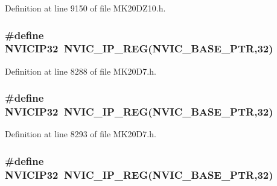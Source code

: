 Definition at line 9150 of file M\+K20\+D\+Z10.\+h.

\subsubsection[{\texorpdfstring{N\+V\+I\+C\+I\+P32}{NVICIP32}}]{\setlength{\rightskip}{0pt plus 5cm}\#define N\+V\+I\+C\+I\+P32~{\bf N\+V\+I\+C\+\_\+\+I\+P\+\_\+\+R\+EG}({\bf N\+V\+I\+C\+\_\+\+B\+A\+S\+E\+\_\+\+P\+TR},32)}\hypertarget{group___n_v_i_c___register___accessor___macros_gae67b5f3cab23d40703ce659637796ac0}{}\label{group___n_v_i_c___register___accessor___macros_gae67b5f3cab23d40703ce659637796ac0}


Definition at line 8288 of file M\+K20\+D7.\+h.

\subsubsection[{\texorpdfstring{N\+V\+I\+C\+I\+P32}{NVICIP32}}]{\setlength{\rightskip}{0pt plus 5cm}\#define N\+V\+I\+C\+I\+P32~{\bf N\+V\+I\+C\+\_\+\+I\+P\+\_\+\+R\+EG}({\bf N\+V\+I\+C\+\_\+\+B\+A\+S\+E\+\_\+\+P\+TR},32)}\hypertarget{group___n_v_i_c___register___accessor___macros_gae67b5f3cab23d40703ce659637796ac0}{}\label{group___n_v_i_c___register___accessor___macros_gae67b5f3cab23d40703ce659637796ac0}


Definition at line 8293 of file M\+K20\+D7.\+h.

\subsubsection[{\texorpdfstring{N\+V\+I\+C\+I\+P32}{NVICIP32}}]{\setlength{\rightskip}{0pt plus 5cm}\#define N\+V\+I\+C\+I\+P32~{\bf N\+V\+I\+C\+\_\+\+I\+P\+\_\+\+R\+EG}({\bf N\+V\+I\+C\+\_\+\+B\+A\+S\+E\+\_\+\+P\+TR},32)}\hypertarget{group___n_v_i_c___register___accessor___macros_gae67b5f3cab23d40703ce659637796ac0}{}\label{group___n_v_i_c___register___accessor___macros_gae67b5f3cab23d40703ce659637796ac0}


